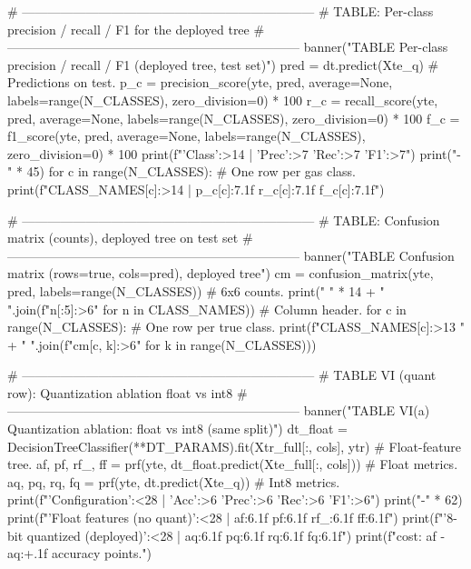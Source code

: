     # ---------------------------------------------------------------------
    # TABLE: Per-class precision / recall / F1 for the deployed tree
    # ---------------------------------------------------------------------
    banner("TABLE  Per-class precision / recall / F1 (deployed tree, test set)")
    pred = dt.predict(Xte_q)                           # Predictions on test.
    p_c = precision_score(yte, pred, average=None, labels=range(N_CLASSES), zero_division=0) * 100
    r_c = recall_score(yte, pred, average=None, labels=range(N_CLASSES), zero_division=0) * 100
    f_c = f1_score(yte, pred, average=None, labels=range(N_CLASSES), zero_division=0) * 100
    print(f"{'Class':>14} | {'Prec':>7} {'Rec':>7} {'F1':>7}")
    print("-" * 45)
    for c in range(N_CLASSES):                          # One row per gas class.
        print(f"{CLASS_NAMES[c]:>14} | {p_c[c]:7.1f} {r_c[c]:7.1f} {f_c[c]:7.1f}")

    # ---------------------------------------------------------------------
    # TABLE: Confusion matrix (counts), deployed tree on test set
    # ---------------------------------------------------------------------
    banner("TABLE  Confusion matrix (rows=true, cols=pred), deployed tree")
    cm = confusion_matrix(yte, pred, labels=range(N_CLASSES))  # 6x6 counts.
    print(" " * 14 + " ".join(f"{n[:5]:>6}" for n in CLASS_NAMES))  # Column header.
    for c in range(N_CLASSES):                          # One row per true class.
        print(f"{CLASS_NAMES[c]:>13} " + " ".join(f"{cm[c, k]:>6}" for k in range(N_CLASSES)))

    # ---------------------------------------------------------------------
    # TABLE VI (quant row): Quantization ablation  float vs int8
    # ---------------------------------------------------------------------
    banner("TABLE VI(a)  Quantization ablation: float vs int8 (same split)")
    dt_float = DecisionTreeClassifier(**DT_PARAMS).fit(Xtr_full[:, cols], ytr)  # Float-feature tree.
    af, pf, rf_, ff = prf(yte, dt_float.predict(Xte_full[:, cols]))  # Float metrics.
    aq, pq, rq, fq = prf(yte, dt.predict(Xte_q))                     # Int8 metrics.
    print(f"{'Configuration':<28} | {'Acc':>6} {'Prec':>6} {'Rec':>6} {'F1':>6}")
    print("-" * 62)
    print(f"{'Float features (no quant)':<28} | {af:6.1f} {pf:6.1f} {rf_:6.1f} {ff:6.1f}")
    print(f"{'8-bit quantized (deployed)':<28} | {aq:6.1f} {pq:6.1f} {rq:6.1f} {fq:6.1f}")
    print(f"\nQuantization cost: {af - aq:+.1f} accuracy points.")

